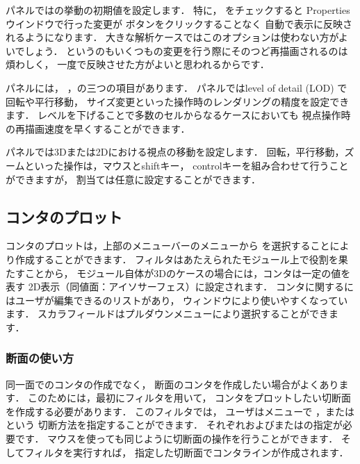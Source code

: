 パネルではの挙動の初期値を設定します．
特に，
%
%
をチェックすると
Propertiesウインドウで行った変更が
%
%
ボタンをクリックすることなく
自動で表示に反映されるようになります．
大きな解析ケースではこのオプションは使わない方がよいでしょう．
というのもいくつもの変更を行う際にそのつど再描画されるのは煩わしく，
一度で反映させた方がよいと思われるからです．

%
%
パネルには，
，の三つの項目があります．
パネルではlevel of detail (LOD) で回転や平行移動，
サイズ変更といった操作時のレンダリングの精度を設定できます．
レベルを下げることで多数のセルからなるケースにおいても
視点操作時の再描画速度を早くすることができます．

パネルでは3Dまたは2Dにおける視点の移動を設定します．
回転，平行移動，ズームといった操作は，マウスとshiftキー，
controlキーを組み合わせて行うことができますが，
割当ては任意に設定することができます．


\subsection{コンタのプロット}
\label{ssec:6.1.6}
コンタのプロットは，上部のメニューバーのメニューから
を選択することにより作成することができます．
フィルタはあたえられたモジュール上で役割を果たすことから，
モジュール自体が3Dのケースの場合には，コンタは一定の値を表す
2D表示（同値面：アイソサーフェス）に設定されます．
コンタに関するにはユーザが編集できるのリストがあり，
ウィンドウにより使いやすくなっています．
スカラフィールドはプルダウンメニューにより選択することができます．

\subsubsection{断面の使い方}
\label{sssec:6.1.6.1}
同一面でのコンタの作成でなく，
断面のコンタを作成したい場合がよくあります．
このためには，最初にフィルタを用いて，
コンタをプロットしたい切断面を作成する必要があります．
このフィルタでは，
ユーザはメニューで
，またはという
切断方法を指定することができます．
%
それぞれおよびまたはの指定が必要です．
マウスを使っても同じように切断面の操作を行うことができます．
そしてフィルタを実行すれば，
指定した切断面でコンタラインが作成されます．

